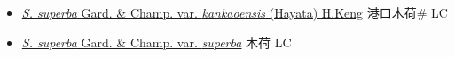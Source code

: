 \begin{itemize}
  \begin{itemize}
        \item[] \href{http://www.theplantlist.org/tpl1.1/search?q=Schima+superba+var.+kankaoensis}{\textit{S. superba} Gard. \& Champ. var. \textit{kankaoensis} (Hayata) H.Keng}   港口木荷\# LC
        \item[] \href{http://www.theplantlist.org/tpl1.1/search?q=Schima+superba+var.+superba}{\textit{S. superba} Gard. \& Champ. var. \textit{superba}}   木荷 LC
  \end{itemize}
  \end{itemize}
